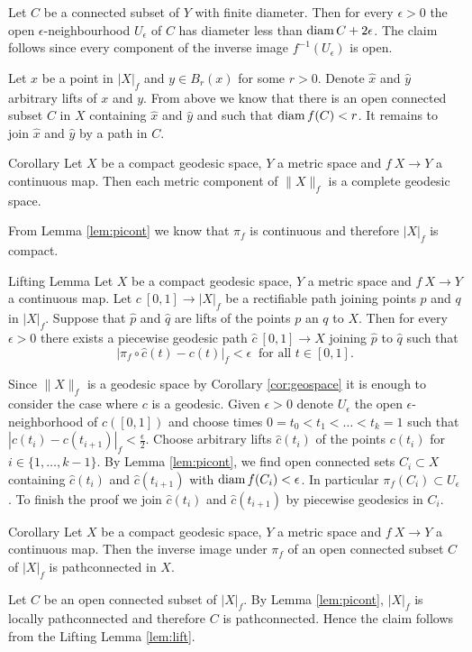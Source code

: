 \documentclass[a4paper,10pt]{amsart}
\begin{document}
Let $C$ be a connected subset of $Y$ with finite diameter. Then for every $\epsilon>0$ the open $\epsilon$-neighbourhood $U_\epsilon$ of $C$ has diameter less than
$\mathop{\rm diam}\nolimits C+2\epsilon$. The claim follows since every component of the inverse image $f^{-1}(U_\epsilon)$ is open. 

Let $x$ be a point in $|X|_f$ and $y\in B_r(x)$ for some $r>0$. Denote $\hat x$ and $\hat y$ arbitrary lifts of $x$ and $y$.
From above we know that there is an open connected subset $C$ in $X$ containing $\hat x$ and $\hat y$ and such that 
$\mathop{\rm diam}\nolimits f(C)<r$. It remains to join $\hat x$ and $\hat y$ by a path in $C$.
\qeds

\begin{thm}{Corollary}\label{cor:geospace}
Let $X$ be a compact geodesic space, $Y$ a metric space and $f\:X\to Y$ a continuous map. Then each metric component of $\|X\|_f$ is a complete geodesic space.
\end{thm}
From Lemma \ref{lem:picont} we know that $\pi_f$ is continuous and therefore $|X|_f$ is compact.
\qeds

\begin{thm}{Lifting Lemma}\label{lem:lift}
Let $X$ be a compact geodesic space, $Y$ a metric space and $f\:X\to Y$ a continuous map. Let $c\:[0,1]\to|X|_f$ be a rectifiable
path joining points $p$ and $q$ in $|X|_f$. Suppose that $\hat p$ and $\hat q$ are lifts of the points $p$ an $q$ to $X$.
Then for every $\epsilon>0$ there exists a piecewise geodesic path $\hat c\:[0,1]\to X$ joining $\hat p$ to $\hat q$ such that 
\[|\pi_f\circ\hat c(t)-c(t)|_f<\epsilon\ \text{ for all }t\in[0,1].\]
\end{thm}
 Since $\|X\|_f$ is a geodesic space by Corollary \ref{cor:geospace} it is enough to consider the case where $c$ is a geodesic.
 Given $\epsilon>0$ denote $U_\epsilon$ the open $\epsilon$-neighborhood of $c([0,1])$ and choose times $0=t_0<t_1<\ldots<t_k=1$ 
 such that $|c(t_i)-c(t_{i+1})|_f<\frac{\epsilon}{2}$. Choose arbitrary lifts $\hat c(t_i)$ of the points
 $c(t_i)$ for $i\in\{1,\ldots,k-1\}$. By Lemma \ref{lem:picont}, we find open connected sets $C_i\subset X$ containing $\hat c(t_i)$ and $\hat c(t_{i+1})$ with
 $\mathop{\rm diam}\nolimits f(C_i)<\epsilon$. In particular $\pi_f(C_i)\subset U_\epsilon$. To finish the proof we join $\hat c(t_i)$ and $\hat c(t_{i+1})$ by piecewise geodesics
 in $C_i$.
\qeds

\begin{thm}{Corollary}\label{cor:connecedpreimage}
Let $X$ be a compact geodesic space, $Y$ a metric space and $f\:X\to Y$ a continuous map. Then
the inverse image under $\pi_f$ of an open connected subset $C$ of $|X|_f$  is pathconnected in $X$.
\end{thm}
Let $C$ be an open connected subset of $|X|_f$. By Lemma \ref{lem:picont}, $|X|_f$ is locally pathconnected and therefore
$C$ is pathconnected. Hence the claim follows from the Lifting Lemma \ref{lem:lift}.
\qeds
\end{document}

